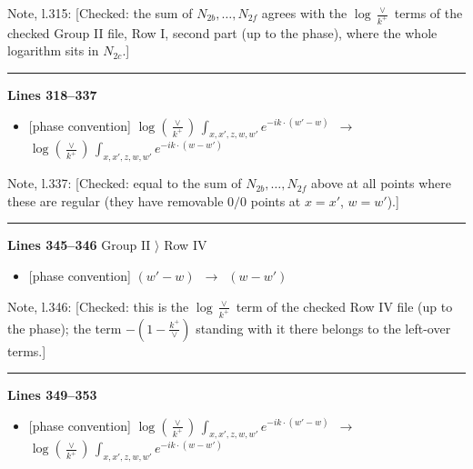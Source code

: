 \documentclass[10pt]{article}
\newenvironment{notebox}{\def\FrameCommand{{\color{notebar}\vrule width 1.5pt}\hspace{6pt}}\MakeFramed{\advance\hsize-\width\FrameRestore}\small}{\endMakeFramed}
\begin{document}
\begin{notebox}\textsf{\small Note, l.315:} [Checked: the sum of $N_{2b},\dots,N_{2f}$ agrees with the $\log\frac{\vee}{k^{+}}$ terms of the checked Group II file, Row I, second part (up to the phase), where the whole logarithm sits in $N_{2c}$.]\end{notebox}
\noindent\rule{\linewidth}{0.3pt}\par\noindent\textbf{Lines 318--337} \par
\begin{itemize}[leftmargin=2.2em,itemsep=1pt,topsep=2pt]
\item[\textbf{l.318}] \textsf{\small [phase convention]} $\displaystyle \log{(\frac{\vee}{k^{+}})}\, \int_{x,x',z,w,w'}e^{-ik\cdot(w'-w)}$\ $\longrightarrow$\ $\displaystyle \log{(\frac{\vee}{k^{+}})}\, \int_{x,x',z,w,w'}e^{-ik\cdot(w-w')}$
\end{itemize}
\begin{notebox}\textsf{\small Note, l.337:} [Checked: equal to the sum of $N_{2b},\dots,N_{2f}$ above at all points where these are regular (they have removable $0/0$ points at $x=x'$, $w=w'$).]\end{notebox}
\noindent\rule{\linewidth}{0.3pt}\par\noindent\textbf{Lines 345--346} \quad \textsf{Group II $\rangle$ Row IV} \par
\begin{itemize}[leftmargin=2.2em,itemsep=1pt,topsep=2pt]
\item[\textbf{l.345}] \textsf{\small [phase convention]} $\displaystyle (w'-w)$\ $\longrightarrow$\ $\displaystyle (w-w')$
\end{itemize}
\begin{notebox}\textsf{\small Note, l.346:} [Checked: this is the $\log\frac{\vee}{k^{+}}$ term of the checked Row IV file (up to the phase); the term $-(1-\frac{k^{+}}{\vee})$ standing with it there belongs to the left-over terms.]\end{notebox}
\noindent\rule{\linewidth}{0.3pt}\par\noindent\textbf{Lines 349--353} \par
\begin{itemize}[leftmargin=2.2em,itemsep=1pt,topsep=2pt]
\item[\textbf{l.349}] \textsf{\small [phase convention]} $\displaystyle \log{(\frac{\vee}{k^{+}})}\, \int_{x,x',z,w,w'}e^{-ik\cdot(w'-w)}$\ $\longrightarrow$\ $\displaystyle \log{(\frac{\vee}{k^{+}})}\, \int_{x,x',z,w,w'}e^{-ik\cdot(w-w')}$
\end{itemize}
\end{document}
